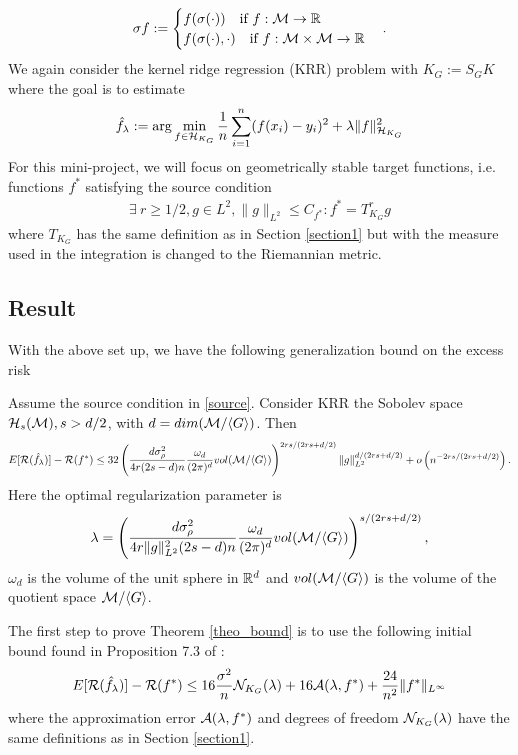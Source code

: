 \begin{align}
\begin{alignedat}{3}
    \sigma f := \begin{cases}
        f(\sigma(\cdot))\quad \text{if }f:\mathcal{M}\to\mathbb{R}\\
        f(\sigma(\cdot),\cdot)\quad \text{if }f:\mathcal{M}\times\mathcal{M}\to\mathbb{R}
    \end{cases}.
\end{alignedat}
\end{align}
We again consider the kernel ridge regression (KRR) problem with $K_G:=S_GK$ where the goal is to estimate
\begin{align}
    \hat{f}_\lambda := \arg\min_{f\in \mathcal{H}_{K_G}}\frac{1}{n}\sum_{i=1}^n(f(x_i)-y_i)^2 + \lambda\|f\|_{\mathcal{H}_{K_G}}^2
\end{align}
For this mini-project, we will focus on geometrically stable target functions, i.e. functions $f^*$ satisfying the source condition
\begin{align}\label{source}
    \exists\ r\ge 1/2, g\in L^2, \|g\|_{L^2}\le C_{f^*}:f^*= T^r_{K_G}g
\end{align}
where $T_{K_G}$ has the same definition as in Section \ref{section1} but with the measure used in the integration is changed to the Riemannian metric.

\subsection{Result}
With the above set up, we have the following generalization bound on the excess risk 
\begin{theorem}\label{theo_bound}
    Assume the source condition in \eqref{source}. Consider KRR the Sobolev space $\mathcal{H}_s(\mathcal{M}), s > d/2$, with $d = dim(\mathcal{M}/\langle G \rangle)$. Then
    \begin{align}
        E[\mathcal{R}(\hat{f}_\lambda)]-\mathcal{R}(f^*)\le
        32\left(\frac{d\sigma^2_\rho}{4r(2s-d)n}\frac{\omega_d}{(2\pi)^d}vol(\mathcal{M}/\langle G\rangle)\right)^{2rs/(2rs+d/2)}\|g\|_{L^2}^{d/(2rs+d/2)} + o\left(n^{-2rs/(2rs+d/2)}\right).
    \end{align}
    Here the optimal regularization parameter is
    \begin{align}
         \lambda = \left(\frac{d\sigma^2_\rho}{4r\|g\|_{L^2}^2(2s-d)n}\frac{\omega_d}{(2\pi)^d}vol(\mathcal{M}/\langle G\rangle)\right)^{s/(2rs+d/2)},
    \end{align}
    $\omega_d$ is the volume of the unit sphere in $\mathbb{R}^d$ and $vol(\mathcal{M}/\langle G\rangle)$ is the volume of the quotient space $\mathcal{M}/\langle G\rangle$.
\end{theorem}
The first step to prove Theorem \ref{theo_bound} is to use the following initial bound found in Proposition 7.3 of \cite{bach2021learning}:
\begin{align}\label{init_bound}
    E[\mathcal{R}(\hat{f}_\lambda)]-\mathcal{R}(f^*)\le 16\frac{\sigma^2}{n}\mathcal{N}_{K_G}(\lambda) + 16\mathcal{A}(\lambda,f^*) + \frac{24}{n^2}\|f^*\|_{L^\infty}
\end{align}
where the approximation error $\mathcal{A}(\lambda,f^*)$ and degrees of freedom $\mathcal{N}_{K_G}(\lambda)$ have the same definitions as in Section \ref{section1}.

